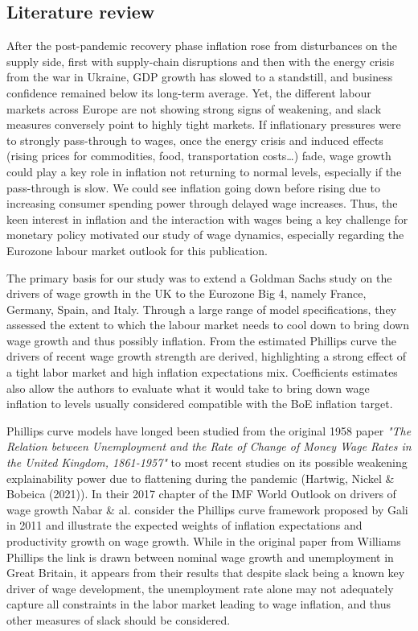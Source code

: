\subsection{Literature review}

\quad After the post-pandemic recovery phase inflation rose from disturbances on the supply side, first with supply-chain disruptions and then with the energy crisis from the war in Ukraine, GDP growth has slowed to a standstill, and business confidence remained below its long-term average. 
Yet, the different labour markets across Europe are not showing strong signs of weakening, and slack measures conversely point to highly tight markets. 
If inflationary pressures were to strongly pass-through to wages, once the energy crisis and induced effects (rising prices for commodities, food, transportation costs\dots) fade, wage growth could play a key role in inflation not returning to normal levels, especially if the pass-through is slow. 
We could see inflation going down before rising due to increasing consumer spending power through delayed wage increases. Thus, the keen interest in inflation and the interaction with wages being a key challenge for monetary policy motivated our study of wage dynamics, especially regarding the Eurozone labour market outlook for this publication. 

The primary basis for our study was to extend a Goldman Sachs study on the drivers of wage growth in the UK to the Eurozone Big 4, namely France, Germany, Spain, and Italy. 
Through a large range of model specifications, they assessed the extent to which the labour market needs to cool down to bring down wage growth and thus possibly inflation.
From the estimated Phillips curve the drivers of recent wage growth strength are derived, highlighting a strong effect of a tight labor market and high inflation expectations mix.
Coefficients estimates also allow the authors to evaluate what it would take to bring down wage inflation to levels usually considered compatible with the BoE inflation target.

Phillips curve models have longed been studied from the original 1958 paper \textit{"The Relation between Unemployment and the Rate of Change of Money Wage Rates in the United Kingdom, 1861-1957"}\cite{labour0} to most recent studies on its possible weakening explainability power due to flattening during the pandemic (Hartwig, Nickel \& Bobeica (2021)\cite{labour1}). 
In their 2017 chapter of the IMF World Outlook on drivers of wage growth Nabar \& al.\cite{labour2} consider the Phillips curve framework proposed by Gali in 2011\cite{labour3} and illustrate the expected weights of inflation expectations and productivity growth on wage growth. 
While in the original paper from Williams Phillips the link is drawn between nominal wage growth and unemployment in Great Britain, it appears from their results that despite slack being a known key driver of wage development, the unemployment rate alone may not adequately capture all constraints in the labor market leading to wage inflation, and thus other measures of slack should be considered.

